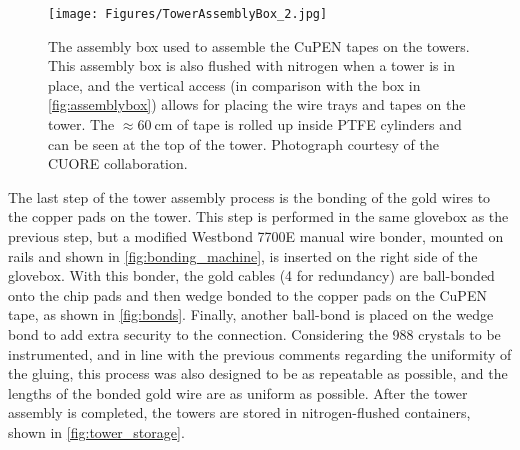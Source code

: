 \begin{figure}[htbp]
    \centering
    \texttt{[image: Figures/TowerAssemblyBox\_2.jpg]}
    \caption[The assembly box used to assemble the CuPEN tapes on the towers.]
    {The assembly box used to assemble the CuPEN tapes on the towers.
    This assembly box is also flushed with nitrogen when a tower is in place, and the vertical access (in comparison with the box in \autoref{fig:assemblybox}) allows for placing the wire trays and tapes on the tower.
    The $\approx60~\textrm{cm}$ of tape is rolled up inside PTFE cylinders and can be seen at the top of the tower.
    Photograph courtesy of the CUORE collaboration.}
    \label{fig:assemblybox_2}
\end{figure}

The last step of the tower assembly process is the bonding of the gold wires to the copper pads on the tower.
This step is performed in the same glovebox as the previous step, but a modified Westbond 7700E manual wire bonder, mounted on rails and shown in \autoref{fig:bonding_machine}, is inserted on the right side of the glovebox.
With this bonder, the gold cables (4 for redundancy) are ball-bonded onto the chip pads and then wedge bonded to the copper pads on the CuPEN tape, as shown in \autoref{fig:bonds}.
Finally, another ball-bond is placed on the wedge bond to add extra security to the connection.
Considering the 988 crystals to be instrumented, and in line with the previous comments regarding the uniformity of the gluing, this process was also designed to be as repeatable as possible, and the lengths of the bonded gold wire are as uniform as possible.
After the tower assembly is completed, the towers are stored in nitrogen-flushed containers, shown in \autoref{fig:tower_storage}.

